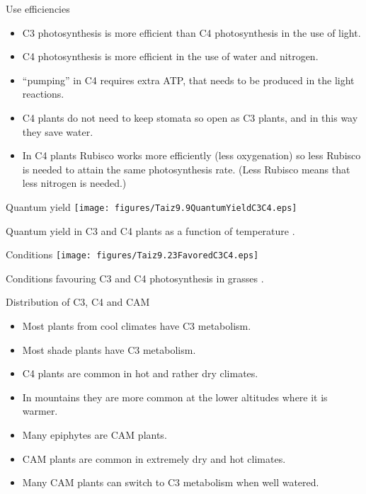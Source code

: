 \documentclass[10pt]{beamer}
\begin{document}
\begin{frame}{Use efficiencies}
    \begin{itemize}
        \item C3 photosynthesis is more efficient than C4 photosynthesis in the use of
        light.
        \item C4 photosynthesis is more efficient in the use of
        water and nitrogen.
        \item \COtwo ``pumping'' in C4 requires extra ATP, that
        needs to be produced in the light reactions.
        \item C4 plants do not need to keep stomata so open as C3 plants, and in this way
        they save water.
        \item In C4 plants Rubisco works more efficiently (less
        oxygenation) so less Rubisco is needed to attain the same
        photosynthesis rate. (Less Rubisco means that less nitrogen
        is needed.)
    \end{itemize}
\end{frame}

\begin{frame}{Quantum yield}
    \centering
    \texttt{[image: figures/Taiz9.9QuantumYieldC3C4.eps]}

    {\small Quantum yield in C3 and C4 plants as a function of
    temperature
    \autocite[from][]{TaiZei2006}.}
\end{frame}

\begin{frame}{Conditions}
    \centering
    \texttt{[image: figures/Taiz9.23FavoredC3C4.eps]}

    {\small Conditions favouring C3 and C4 photosynthesis in grasses
    \autocite[from][]{TaiZei2006}.}
\end{frame}

\begin{frame}{Distribution of C3, C4 and CAM}
    \begin{itemize}
        \item Most plants from cool climates have C3 metabolism.
        \item Most shade plants have C3 metabolism.
        \item C4 plants are common in hot and rather dry climates.
        \item In mountains they are more common at the lower
        altitudes where it is warmer.
        \item Many epiphytes are CAM plants.
        \item CAM plants are common in extremely dry and hot
        climates.
        \item Many CAM plants can switch to C3 metabolism when well
        watered.
    \end{itemize}
\end{frame}
\end{document}
